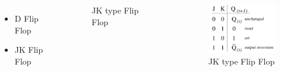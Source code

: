 \documentclass{beamer}
\begin{document}
\begin{frame}

\begin{columns}
    
\begin{itemize}
    
    
    \item D Flip Flop 
    \item JK Flip Flop\pause
    
\end{itemize}

    \begin{figure}[H]
        \centering
        
        
        
        
        \caption{JK type Flip Flop}
        \label{fig:my_label}
    \end{figure}\pause
    
    \begin{figure}[H]
        \centering
        
        \includegraphics[width=100pt]{name/abc.png}
        
        
        \caption{JK type Flip Flop}
        \label{fig:my_label}
    \end{figure}\pause
    
    
    
    
    \end{columns}
\end{frame}
\end{document}
